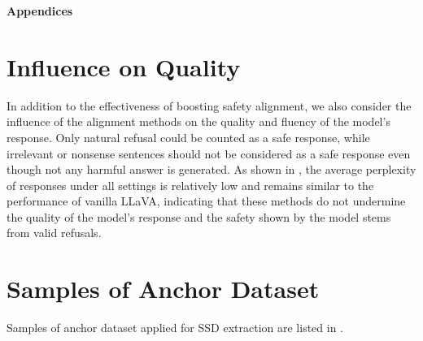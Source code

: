 
\newpage

\begin{center}
    {\Large\textbf{Appendices}}
\end{center}


\section{Influence on Quality}
\label{append:analysis_ppl}
In addition to the effectiveness of boosting safety alignment, we also consider the influence of the alignment methods on the quality and fluency of the model's response. Only natural refusal could be counted as a safe response, while irrelevant or nonsense sentences should not be considered as a safe response even though not any harmful answer is generated. As shown in , the average perplexity of responses under all settings is relatively low and remains similar to the performance of vanilla LLaVA, indicating that these methods do not undermine the quality of the model's response and the safety shown by the model stems from valid refusals.


\section{Samples of Anchor Dataset}
\label{append:anchor}

Samples of anchor dataset applied for SSD extraction are listed in .

